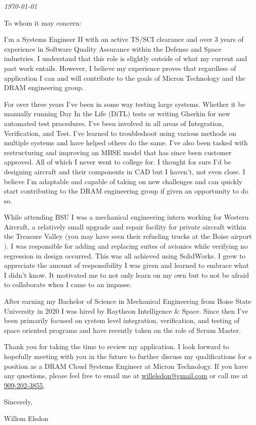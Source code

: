 \documentclass{ExpressiveCoverLetter}
\begin{document}
\coverletterheader[
    firstname=Willem,
    middleinitial=N,
    lastname=Elsdon,
    email=willelsdon@gmail.com,
    phone=909-202-3855,
    linkedin=willem-elsdon,
    github=welsdon,
    city=Boise,
    state=Idaho
]

\vspace{0.05in}
\emph{\today}
\vspace{0.15in}


To whom it may concern:

I'm a Systems Engineer II with an active TS/SCI clearance and over 3 years of experience in Software
Quality Assurance within the Defense and Space industries. I understand that this
role is slightly outside of what my current and past work entails. However, I
believe my experience proves that regardless of application I can and will contribute to
the goals of Micron Technology and the DRAM engineering group.

For over three years I've been in some way testing large systems.
Whether it be manually running Day In the Life $($DiTL$)$ tests or
writing Gherkin for new automated test procedures. I've been involved in
all areas of Integration, Verification, and Test. I've learned to
troubleshoot using various methods on multiple systems and have helped
others do the same. I've also been tasked with restructuring and
improving an MBSE model that has since been customer approved. All of which I never went to college for. I thought
for sure I'd be designing aircraft and their components in CAD but I
haven't, not even close. I believe I'm adaptable and capable of
taking on new challenges and can quickly start contributing to the DRAM
engineering group if given an opportunity to do so.

While attending BSU I was a mechanical engineering intern working for
Western Aircraft, a relatively small upgrade and repair facility for
private aircraft within the Treasure Valley $($you may have seen their
refueling trucks at the Boise airport$)$. I was responsible for
adding and replacing suites of avionics while verifying no regression in
design occurred. This was all achieved using SolidWorks. I grew to
appreciate the amount of responsibility I was given and learned to
embrace what I didn't know. It motivated me to not only learn on my own
but to not be afraid to collaborate when I came to an impasse.

After earning my Bachelor of Science in Mechanical Engineering from
Boise State University in 2020 I was hired by Raytheon Intelligence \&
Space. Since then I've been primarily focused
on system level integration, verification, and testing of space oriented programs
and have recently taken on the role of Scrum Master.

Thank you for taking the time to review my application. I look forward
to hopefully meeting with you in the future to further discuss my
qualifications for a position as a DRAM Cloud Systems Engineer at Micron Technology.
If you have any questions, please feel free to
email me at \href{mailto:willelsdon@gmail.com}{willelsdon@gmail.com} or
call me at \href{tel:+1-909-202-3855}{909-202-3855}.

Sincerely,

\vspace{0.05in}

Willem Elsdon
\end{document}
